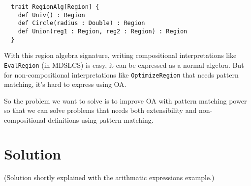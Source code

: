 \documentclass[preprint]{llncs}
\begin{document}
\begin{lstlisting}
  trait RegionAlg[Region] {
    def Univ() : Region
    def Circle(radius : Double) : Region
    def Union(reg1 : Region, reg2 : Region) : Region
  }
\end{lstlisting}

With this region algebra signature, writing compositional
interpretations like \texttt{EvalRegion} (in
MDSLCS\cite{Hofer:2010:MDL:1868294.1868307}) is easy, it can be
expressed as a normal algebra. But for non-compositional
interpretations like \texttt{OptimizeRegion} that needs pattern
matching, it's hard to express using OA.

So the problem we want to solve is to improve OA with pattern matching
power so that we can solve problems that needs both extensibility and
non-compositional definitions using pattern matching.

\section{Solution}
(Solution shortly explained with the arithmatic expressions example.)
\end{document}
